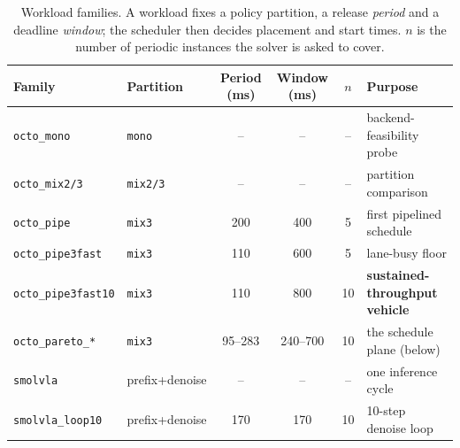 \begin{table}[t]
\centering
\caption{Workload families.  A workload fixes a policy partition, a release
\emph{period} and a deadline \emph{window}; the scheduler then decides
placement and start times.  $n$ is the number of periodic instances the
solver is asked to cover.}
\label{tab:workloads}
\small
\begin{tabular}{llccc l}
\toprule
Family & Partition & Period (\si{\milli\second}) & Window (\si{\milli\second}) & $n$ & Purpose \\
\midrule
\texttt{octo\_mono}       & \texttt{mono}  & --      & --      & --  & backend-feasibility probe \\
\texttt{octo\_mix2/3}     & \texttt{mix2/3}& --      & --      & --  & partition comparison \\
\texttt{octo\_pipe}       & \texttt{mix3}  & 200     & 400     & 5   & first pipelined schedule \\
\texttt{octo\_pipe3fast}  & \texttt{mix3}  & 110     & 600     & 5   & lane-busy floor \\
\texttt{octo\_pipe3fast10}& \texttt{mix3}  & 110     & 800     & 10  & \textbf{sustained-throughput vehicle} \\
\texttt{octo\_pareto\_*}  & \texttt{mix3}  & 95--283 & 240--700& 10  & the schedule plane (below) \\
\addlinespace
\texttt{smolvla}          & prefix+denoise & --      & --      & --  & one inference cycle \\
\texttt{smolvla\_loop10}  & prefix+denoise & 170     & 170     & 10  & 10-step denoise loop \\
\bottomrule
\end{tabular}
\end{table}

